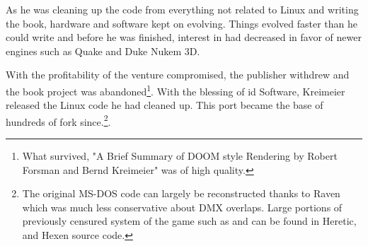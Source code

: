 \par
 As he was cleaning up the code from everything not related to Linux and writing the book, hardware and software kept on evolving. Things evolved faster than he could write and before he was finished, interest in \doom{} had decreased in favor of newer engines such as Quake and Duke Nukem 3D.\\
 \par
  With the profitability of the venture compromised, the publisher withdrew and the book project was abandoned\footnote{What survived, "A Brief Summary of DOOM style Rendering by Robert Forsman and Bernd Kreimeier" was of high quality.}. With the blessing of id Software, Kreimeier released the Linux code he had cleaned up. This port became the base of hundreds of fork since.\footnote{The original MS-DOS code can largely be reconstructed thanks to Raven which was much less conservative about DMX overlaps. Large portions of previously censured system of the game such as  and  can be found in Heretic, and Hexen source code.}.\\
 \par  


